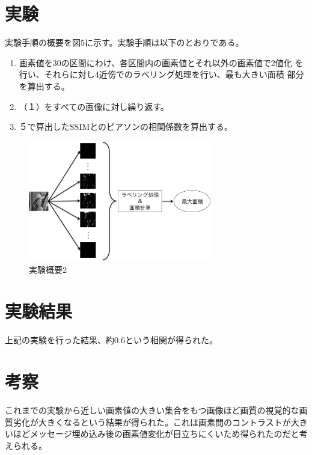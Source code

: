 \documentclass[a4j,fleqn,10pt]{jsarticle}
\begin{document}
\section{実験}
実験手順の概要を図5に示す。実験手順は以下のとおりである。

\begin{enumerate}
\renewcommand{\labelenumi}{(\arabic{enumi})}
 \item 画素値を30の区間にわけ、各区間内の画素値とそれ以外の画素値で2値化
       を行い、それらに対し4近傍でのラベリング処理を行い、最も大きい面積
       部分を算出する。
 \item （１）をすべての画像に対し繰り返す。
 \item ５で算出したSSIMとのピアソンの相関係数を算出する。
\end{enumerate}

\begin{figure}[htbp]
 \begin{center}
  \includegraphics[width=8cm]{experiment2.png}
 \end{center}
 \caption{実験概要2}
\end{figure}

\section{実験結果}
上記の実験を行った結果、約0.6という相関が得られた。

\section{考察}
これまでの実験から近しい画素値の大きい集合をもつ画像ほど画質の視覚的な画
質劣化が大きくなるという結果が得られた。これは画素間のコントラストが大き
いほどメッセージ埋め込み後の画素値変化が目立ちにくいため得られたのだと考
えられる。




\end{document}
